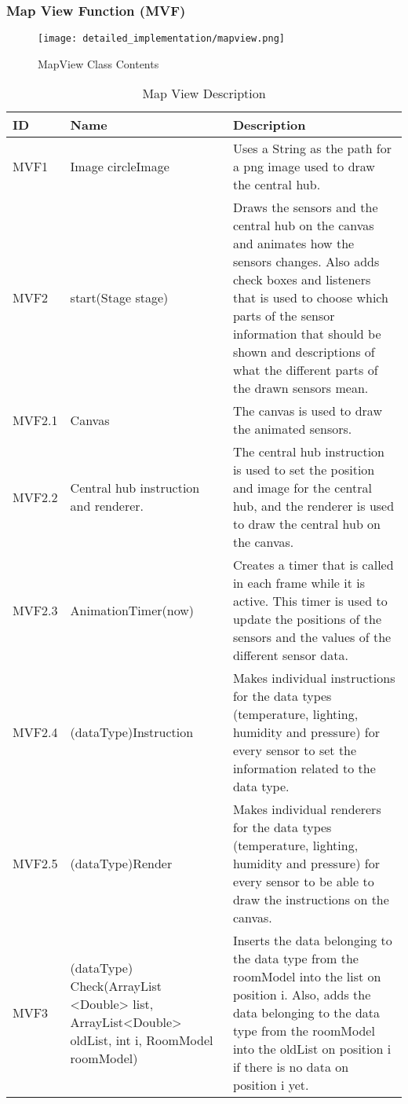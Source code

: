 \documentclass[../document]{subfiles}
\begin{document}
\subsubsection{Map View Function (MVF)}

\begin{figure}[H]
\centering
\texttt{[image: detailed\_implementation/mapview.png]}
\caption{MapView Class Contents}
\end{figure}

\begin{table}[H]
\caption{Map View Description}
\centering
\begin{tabularx}{\textwidth}{|L{1.2cm}|L{3.5cm}|X|}
	\hline
	ID
	&Name
	&Description
	\\ \hline MVF1
	&Image circleImage
	&Uses a String as the path for a png image used to draw the central hub.
	\\ \hline MVF2
	&start(Stage stage)
	&Draws the sensors and the central hub on the canvas and animates how the sensors changes. Also adds check boxes and listeners that is used to choose which parts of the sensor information that should be shown and descriptions of what the different parts of the drawn sensors mean.  
	\\ \hline MVF2.1
	&Canvas
	&The canvas is used to draw the animated sensors.
	\\ \hline MVF2.2
	&Central hub instruction and renderer.
	&The central hub instruction is used to set the position and image for the central hub, and the renderer is used to draw the central hub on the canvas.
	\\ \hline MVF2.3
	&AnimationTimer(now)
	&Creates a timer that is called in each frame while it is active. This timer is used to update the positions of the sensors and the values of the different sensor data.
	\\ \hline MVF2.4
	&(dataType)Instruction
	&Makes individual instructions for the data types (temperature, lighting, humidity and pressure) for every sensor to set the information related to the data type.
	\\ \hline MVF2.5
	&(dataType)Render
	&Makes individual renderers for the data types (temperature, lighting, humidity and pressure) for every sensor to be able to draw the instructions on the canvas.
	\\ \hline MVF3
	&(dataType) Check(ArrayList <Double> list, ArrayList<Double> oldList, int i, RoomModel roomModel)
	&Inserts the data belonging to the data type from the roomModel into the list on position i. Also, adds the data belonging to the data type from the roomModel into the oldList on position i if there is no data on position i yet.
	\\ \hline 
\end{tabularx}
\end{table}
\end{document}
